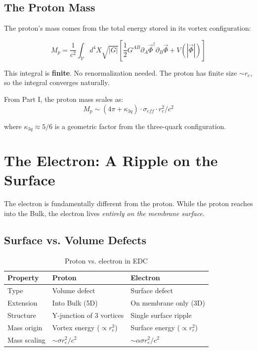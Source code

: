\subsection{The Proton Mass}
\label{subsec:proton_mass}

The proton's mass comes from the total energy stored in its vortex configuration:

\begin{equation}
M_p = \frac{1}{c^2} \int_{\mathcal{V}} d^4X \sqrt{|G|} \left[ \frac{1}{2} G^{AB} \partial_A \vec{\Phi}^\dagger \partial_B \vec{\Phi} + V(|\vec{\Phi}|) \right]
\end{equation}

This integral is \textbf{finite}. No renormalization needed. The proton has finite size $\sim r_e$, so the integral converges naturally.

From Part I, the proton mass scales as:
\begin{equation}
M_p \sim (4\pi + \kappa_{3q}) \cdot \sigma_{eff} \cdot r_e^2 / c^2
\end{equation}

where $\kappa_{3q} \approx 5/6$ is a geometric factor from the three-quark configuration.


\section{The Electron: A Ripple on the Surface}
\label{sec:electron}

The electron is fundamentally different from the proton. While the proton reaches into the Bulk, the electron lives \textit{entirely on the membrane surface}.

\subsection{Surface vs. Volume Defects}
\label{subsec:surface_volume}

\begin{table}[h]
\centering
\begin{tabular}{|l|l|l|}
\hline
\textbf{Property} & \textbf{Proton} & \textbf{Electron} \\
\hline
Type & Volume defect & Surface defect \\
Extension & Into Bulk (5D) & On membrane only (3D) \\
Structure & Y-junction of 3 vortices & Single surface ripple \\
Mass origin & Vortex energy ($\propto r_e^3$) & Surface energy ($\propto r_e^2$) \\
Mass scaling & $\sim \sigma r_e^2 / c^2$ & $\sim \alpha \sigma r_e^2 / c^2$ \\
\hline
\end{tabular}
\caption{Proton vs. electron in EDC}
\label{tab:proton_electron}
\end{table}

